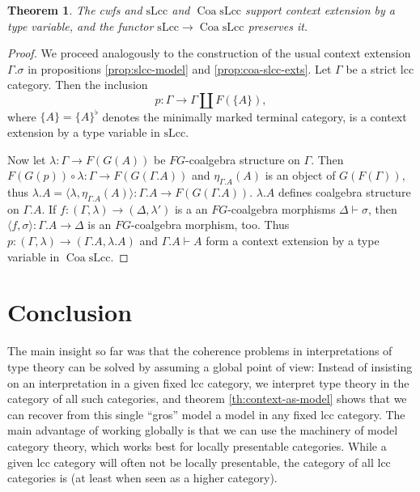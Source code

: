 \documentclass[a4paper]{article}
\newtheorem{theorem}{Theorem}
\theoremstyle{remark}
\theoremstyle{definition}
\begin{document}
\begin{theorem}
  \label{th:slcc-coa-slcc-type-ext}
  The cwfs and $\mathrm{sLcc}$ and $\operatorname{Coa} \mathrm{sLcc}$ support context extension by a type variable, and the functor $\mathrm{sLcc} \rightarrow \operatorname{Coa} \mathrm{sLcc}$ preserves it.
\end{theorem}
\begin{proof}
  We proceed analogously to the construction of the usual context extension $\Gamma.\sigma$ in propositions \ref{prop:slcc-model} and \ref{prop:coa-slcc-exts}.
  Let $\Gamma$ be a strict lcc category.
  Then the inclusion
  \begin{equation}
    p : \Gamma \rightarrow \Gamma \amalg F(\{A\}),
  \end{equation}
  where $\{ A \} = \{ A \}^\flat$ denotes the minimally marked terminal category, is a context extension by a type variable in $\mathrm{sLcc}$.

  Now let $\lambda : \Gamma \rightarrow F(G(A))$  be $FG$-coalgebra structure on $\Gamma$.
  Then $F(G(p)) \circ \lambda : \Gamma \rightarrow F(G(\Gamma.A))$ and $\eta_{\Gamma.A}(A)$ is an object of $G(F(\Gamma))$, thus $\lambda.A = \langle \lambda, \eta_{\Gamma.A}(A) \rangle : \Gamma.A \rightarrow F(G(\Gamma.A))$.
  $\lambda.A$ defines coalgebra structure on $\Gamma.A$.
  If $f : (\Gamma, \lambda) \rightarrow (\Delta, \lambda')$ is a an $FG$-coalgebra morphisms $\Delta \vdash \sigma$, then $\langle f, \sigma \rangle : \Gamma.A \rightarrow \Delta$ is an $FG$-coalgebra morphism, too.
  Thus $p : (\Gamma, \lambda) \rightarrow (\Gamma.A, \lambda.A)$ and $\Gamma.A \vdash A$ form a context extension by a type variable in $\operatorname{Coa} \mathrm{sLcc}$.
\end{proof}

\section{Conclusion}

The main insight so far was that the coherence problems in interpretations of type theory can be solved by assuming a global point of view:
Instead of insisting on an interpretation in a given fixed lcc category, we interpret type theory in the category of all such categories, and theorem \ref{th:context-as-model} shows that we can recover from this single ``gros'' model a model in any fixed lcc category.
The main advantage of working globally is that we can use the machinery of model category theory, which works best for locally presentable categories.
While a given lcc category will often not be locally presentable, the category of all lcc categories is (at least when seen as a higher category).




\end{document}
